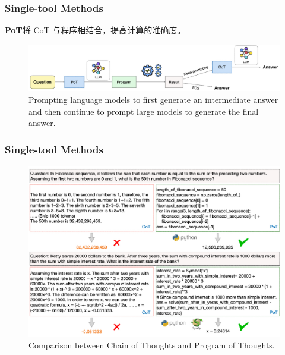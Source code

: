 \begin{frame}
	\frametitle{Single-tool Methods}

	\textbf{PoT}将 CoT 与程序相结合，提高计算的准确度。
	\begin{figure}[h]
		\centering
		\includegraphics[width=1.0\linewidth]{pic/chainer.001.jpeg}
		\caption{Prompting language models to first generate an intermediate answer and then continue to prompt large models to generate the final answer.}
		\label{fig:chainer}
		\vspace{-2ex}
	\end{figure}
\end{frame}

\begin{frame}
	\frametitle{Single-tool Methods}
	\begin{figure}[h]
		\centering
		\includegraphics[width=0.7\linewidth]{pic/intro.001.pdf}
		\caption{Comparison between Chain of Thoughts and Program of Thoughts. }
		\label{fig:intro}
	\end{figure}
\end{frame}


